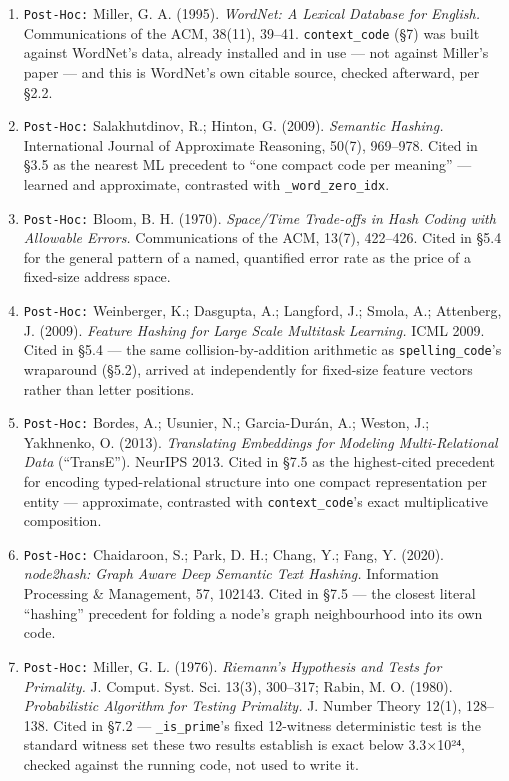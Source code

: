 \documentclass[
  10pt,
]{article}
\begin{document}
\begin{enumerate}
  \emph{Lives without imagery -- Congenital aphantasia.} Cortex, 73,
  378--380. Cited in §11 for the naming origin of the Mind's Eye ---
  offered as motivation, not as a claim about how either system actually
  works.
\item
  \texttt{Post-Hoc:} Miller, G. A. (1995). \emph{WordNet: A Lexical
  Database for English.} Communications of the ACM, 38(11), 39--41.
  \texttt{context\_code} (§7) was built against WordNet's data, already
  installed and in use --- not against Miller's paper --- and this is
  WordNet's own citable source, checked afterward, per §2.2.
\item
  \texttt{Post-Hoc:} Salakhutdinov, R.; Hinton, G. (2009).
  \emph{Semantic Hashing.} International Journal of Approximate
  Reasoning, 50(7), 969--978. Cited in §3.5 as the nearest ML precedent
  to ``one compact code per meaning'' --- learned and approximate,
  contrasted with \texttt{\_word\_zero\_idx}.
\item
  \texttt{Post-Hoc:} Bloom, B. H. (1970). \emph{Space/Time Trade-offs in
  Hash Coding with Allowable Errors.} Communications of the ACM, 13(7),
  422--426. Cited in §5.4 for the general pattern of a named, quantified
  error rate as the price of a fixed-size address space.
\item
  \texttt{Post-Hoc:} Weinberger, K.; Dasgupta, A.; Langford, J.; Smola,
  A.; Attenberg, J. (2009). \emph{Feature Hashing for Large Scale
  Multitask Learning.} ICML 2009. Cited in §5.4 --- the same
  collision-by-addition arithmetic as \texttt{spelling\_code}'s
  wraparound (§5.2), arrived at independently for fixed-size feature
  vectors rather than letter positions.
\item
  \texttt{Post-Hoc:} Bordes, A.; Usunier, N.; Garcia-Durán, A.; Weston,
  J.; Yakhnenko, O. (2013). \emph{Translating Embeddings for Modeling
  Multi-Relational Data} (``TransE''). NeurIPS 2013. Cited in §7.5 as
  the highest-cited precedent for encoding typed-relational structure
  into one compact representation per entity --- approximate, contrasted
  with \texttt{context\_code}'s exact multiplicative composition.
\item
  \texttt{Post-Hoc:} Chaidaroon, S.; Park, D. H.; Chang, Y.; Fang, Y.
  (2020). \emph{node2hash: Graph Aware Deep Semantic Text Hashing.}
  Information Processing \& Management, 57, 102143. Cited in §7.5 ---
  the closest literal ``hashing'' precedent for folding a node's graph
  neighbourhood into its own code.
\item
  \texttt{Post-Hoc:} Miller, G. L. (1976). \emph{Riemann's Hypothesis
  and Tests for Primality.} J. Comput. Syst. Sci. 13(3), 300--317;
  Rabin, M. O. (1980). \emph{Probabilistic Algorithm for Testing
  Primality.} J. Number Theory 12(1), 128--138. Cited in §7.2 ---
  \texttt{\_is\_prime}'s fixed 12-witness deterministic test is the
  standard witness set these two results establish is exact below
  3.3×10²⁴, checked against the running code, not used to write it.
\end{enumerate}
\end{document}
